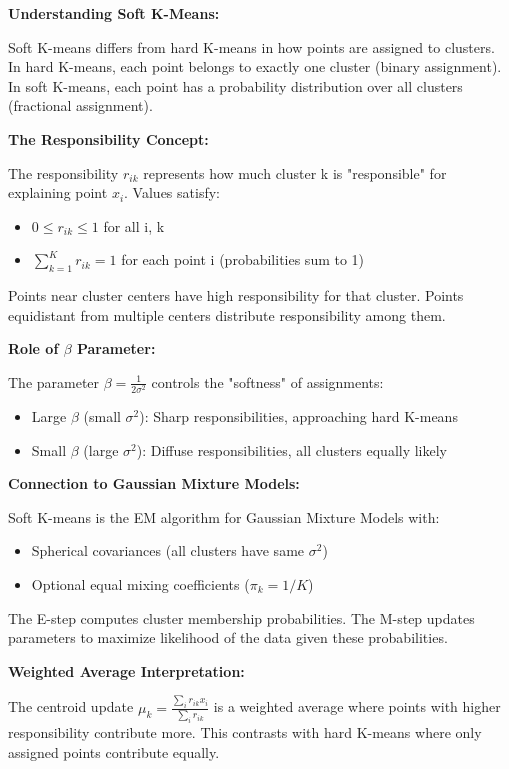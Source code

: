 \documentclass[12pt]{article}
\begin{document}
\begin{explanation}
\textbf{Understanding Soft K-Means:}

Soft K-means differs from hard K-means in how points are assigned to clusters. In hard K-means, each point belongs to exactly one cluster (binary assignment). In soft K-means, each point has a probability distribution over all clusters (fractional assignment).

\textbf{The Responsibility Concept:}

The responsibility $r_{ik}$ represents how much cluster k is "responsible" for explaining point $x_i$. Values satisfy:
\begin{itemize}
    \item $0 \leq r_{ik} \leq 1$ for all i, k
    \item $\sum_{k=1}^K r_{ik} = 1$ for each point i (probabilities sum to 1)
\end{itemize}

Points near cluster centers have high responsibility for that cluster. Points equidistant from multiple centers distribute responsibility among them.

\textbf{Role of $\beta$ Parameter:}

The parameter $\beta = \frac{1}{2\sigma^2}$ controls the "softness" of assignments:
\begin{itemize}
    \item Large $\beta$ (small $\sigma^2$): Sharp responsibilities, approaching hard K-means
    \item Small $\beta$ (large $\sigma^2$): Diffuse responsibilities, all clusters equally likely
\end{itemize}

\textbf{Connection to Gaussian Mixture Models:}

Soft K-means is the EM algorithm for Gaussian Mixture Models with:
\begin{itemize}
    \item Spherical covariances (all clusters have same $\sigma^2$)
    \item Optional equal mixing coefficients ($\pi_k = 1/K$)
\end{itemize}

The E-step computes cluster membership probabilities. The M-step updates parameters to maximize likelihood of the data given these probabilities.

\textbf{Weighted Average Interpretation:}

The centroid update $\mu_k = \frac{\sum_i r_{ik} x_i}{\sum_i r_{ik}}$ is a weighted average where points with higher responsibility contribute more. This contrasts with hard K-means where only assigned points contribute equally.

\end{explanation}
\end{document}
